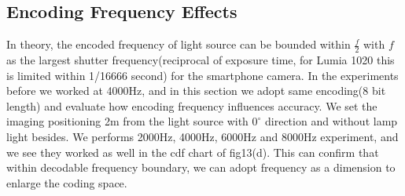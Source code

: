\documentclass[conference]{IEEEtran}
\begin{document}
\begin{figure}
	\footnotesize
\end{figure}

\subsection{\textbf{Encoding Frequency Effects}}
In theory, the encoded frequency of light source can be bounded within $\frac{f}{2}$ with $f$ as the largest shutter frequency(reciprocal of exposure time, for Lumia 1020 this is limited within 1/16666 second) for the smartphone camera. In the experiments before we worked at 4000Hz, and in this section we adopt same encoding(8 bit length) and evaluate how encoding frequency influences accuracy. We set the imaging positioning 2m from the light source with $0^{\circ}$ direction and without lamp light besides. We performs 2000Hz, 4000Hz, 6000Hz and 8000Hz experiment, and we see they worked as well in the cdf chart of fig13(d). This can confirm that within decodable frequency boundary, we can adopt frequency as a dimension to enlarge the coding space.
\end{document}
